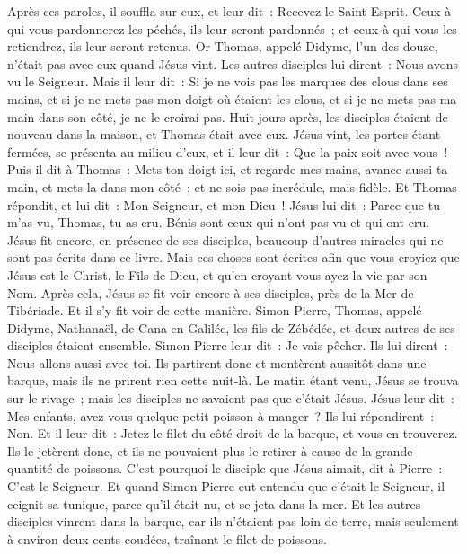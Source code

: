 \begin{multicols}{2}
Après ces paroles, il souffla sur eux, et leur dit~: Recevez le Saint-Esprit.
Ceux à qui vous pardonnerez les péchés, ils leur seront pardonnés~; et ceux à qui vous les retiendrez, ils leur seront retenus.
Or Thomas, appelé Didyme, l'un des douze, n'était pas avec eux quand Jésus vint.
Les autres disciples lui dirent~: Nous avons vu le Seigneur. Mais il leur dit~: Si je ne vois pas les marques des clous dans ses mains, et si je ne mets pas mon doigt où étaient les clous, et si je ne mets pas ma main dans son côté, je ne le croirai pas.
Huit jours après, les disciples étaient de nouveau dans la maison, et Thomas était avec eux. Jésus vint, les portes étant fermées, se présenta au milieu d'eux, et il leur dit~: Que la paix soit avec vous~!
Puis il dit à Thomas~: Mets ton doigt ici, et regarde mes mains, avance aussi ta main, et mets-la dans mon côté~; et ne sois pas incrédule, mais fidèle.
Et Thomas répondit, et lui dit~: Mon Seigneur, et mon Dieu~!
Jésus lui dit~: Parce que tu m'as vu, Thomas, tu as cru. Bénis sont ceux qui n'ont pas vu et qui ont cru.
Jésus fit encore, en présence de ses disciples, beaucoup d'autres miracles qui ne sont pas écrits dans ce livre.
Mais ces choses sont écrites afin que vous croyiez que Jésus est le Christ, le Fils de Dieu, et qu'en croyant vous ayez la vie par son Nom.
\VerseOne{}Après cela, Jésus se fit voir encore à ses disciples, près de la Mer de Tibériade. Et il s'y fit voir de cette manière.
Simon Pierre, Thomas, appelé Didyme, Nathanaël, de Cana en Galilée, les fils de Zébédée, et deux autres de ses disciples étaient ensemble.
Simon Pierre leur dit~: Je vais pêcher. Ils lui dirent~: Nous allons aussi avec toi. Ils partirent donc et montèrent aussitôt dans une barque, mais ils ne prirent rien cette nuit-là.
Le matin étant venu, Jésus se trouva sur le rivage~; mais les disciples ne savaient pas que c'était Jésus.
Jésus leur dit~: Mes enfants, avez-vous quelque petit poisson à manger~? Ils lui répondirent~: Non.
Et il leur dit~: Jetez le filet du côté droit de la barque, et vous en trouverez. Ils le jetèrent donc, et ils ne pouvaient plus le retirer à cause de la grande quantité de poissons.
C'est pourquoi le disciple que Jésus aimait, dit à Pierre~: C'est le Seigneur. Et quand Simon Pierre eut entendu que c'était le Seigneur, il ceignit sa tunique, parce qu'il était nu, et se jeta dans la mer.
Et les autres disciples vinrent dans la barque, car ils n'étaient pas loin de terre, mais seulement à environ deux cents coudées, traînant le filet de poissons.

\end{multicols}
